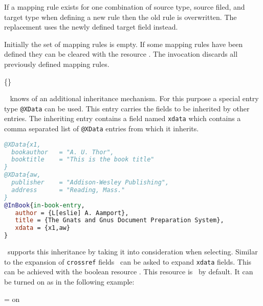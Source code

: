 \documentclass[11pt,a4paper]{scrbook}
\begin{document}
If a mapping rule exists for one combination of source type, source filed, and
target type when defining a new rule then the old rule is overwritten. The
replacement uses the newly defined target field instead.

Initially the set of mapping rules is empty. If some mapping rules have been
defined they can be cleared with the resource . The
invocation discards all previously defined mapping rules.

\begin{Resources}
   \{\}
\end{Resources}

\bibLaTeX\ \cite{lehmann:biblatex} knows of an additional inheritance
mechanism. For this purpose a special entry type \texttt{@XData} can be used.
This entry carries the fields to be inherited by other entries.
The inheriting entry contains a field named \texttt{xdata} which contains a
comma separated list of \texttt{@XData} entries from which it inherits.

\begin{lstlisting}[language=BibTeX]
@XData{x1,
  bookauthor   = "A. U. Thor",
  booktitle    = "This is the book title"
}
@XData{aw,
  publisher    = "Addison-Wesley Publishing",
  address      = "Reading, Mass."
}
@InBook{in-book-entry,
   author = {L[eslie] A. Aamport},
   title = {The Gnats and Gnus Document Preparation System},
   xdata = {x1,aw}
}
\end{lstlisting}

\BibTool\ supports this inheritance by taking it into consideration when
selecting. Similar to the expansion of \texttt{crossref} fields \BibTool\ can
be asked to expand \texttt{xdata} fields. This can be achieved with the
boolean resource . This resource is \off\ by default. It can
be turned on as in the following example:

\begin{Resources}
   = on
\end{Resources}
\end{document}
